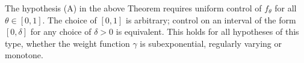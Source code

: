 \documentclass[a4paper,10pt,reqno]{amsart}
\numberwithin{equation}{section}
\theoremstyle{definition}
\theoremstyle{remark}
\DeclareMathOperator{\1}{\mathbbm 1}
\begin{document}
	The hypothesis (A) in the above Theorem requires uniform control of $f_\theta$ for all $\theta\in [0,1]$. The choice of $[0,1]$ is arbitrary; control on an interval of the form $[0,\delta]$ for any choice of $\delta>0$ is equivalent. This holds for all hypotheses of this type, whether the weight function $\gamma$ is subexponential, regularly varying or monotone.  
	
\end{document}
